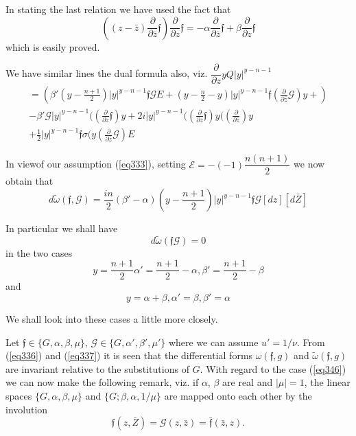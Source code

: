  In stating the last relation we have used the fact that
 $$
 ((z - \bar{z})\frac{\partial}{\partial \bar{z}}\mathfrak{f})
 \frac{\partial}{\partial z} \mathfrak{f} =- \alpha
 \frac{\partial}{\partial \bar{z}} \mathfrak{f} + \beta
 \frac{\partial}{\partial z} \mathfrak{f} 
 $$
 which is easily proved.
 
 We have similar lines the dual formula also, viz.
 $\dfrac{\partial}{\partial z} y Q |y| ^{y -n -1}$
 \begin{gather*}
= (\beta' (y - \frac{n+1}{2}) |y|^{y - n - 1} \mathfrak{f}
\mathcal{G} E + (y - \frac{n}{2} - y) |y|^{y - n - 1}
\mathfrak{f} (\frac{\partial}{\partial \bar{z}}\mathcal{G}) y +)\\ 
- \beta ' \mathcal{G} |y|^{y - n - 1} ((\frac{\partial}{\partial
  z}\mathfrak{f}) y + 2i |y|^{y - n -1}((\frac{\partial}{\partial
  z} \mathfrak{f}) y ((\frac{\partial}{\partial \bar{z}}) y\\ 
+ \frac{1}{2}|y|^{y - n -1} \mathfrak{f} \sigma (y
(\frac{\partial}{\partial \bar{z}} \mathcal{G}) E \tag{342}\label{eq342}   
 \end{gather*} 
 
 In view\pageoriginale of our assumption (\ref{eq333}), setting
 $\mathcal{E} = - (-1)  \dfrac {n (n + 1 )}{2}$ we now obtain that   
 \begin{equation*}
d \tilde{\omega} (\mathfrak{f}, \mathcal{G}) = \frac{in } {2} (\beta' -
\alpha )(y - \frac{n + 1 } {2}) |y|^{y - n - 1} \mathfrak{f}
\mathcal{G} [dz ] [ d \bar{Z}] \tag{343}\label{eq343}   
 \end{equation*} 
 
 In particular we shall have 
 \begin{equation*}
d \tilde{\omega } (\mathfrak{f} \mathscr{G}) = 0 \tag{344}\label{eq344}  
 \end{equation*} 
 in the two cases 
 \begin{equation*}
y = \frac{n + 1 } {2} \alpha' = \frac{n + 1 } {2} - \alpha,
\beta' = \frac{n + 1 } {2} - \beta \tag{345}\label{eq345}   
 \end{equation*} 
 and 
 \begin{equation*}
y = \alpha + \beta, \alpha' = \beta, \beta' = \alpha \tag{346}\label{eq346}  
 \end{equation*} 
 
 We shall look into these cases a little more closely. 
 
 Let $\mathfrak{f} \in \{ G, \alpha, \beta, \mu \}$, $\mathcal{G} \in
 \{ G, \alpha', \beta', \mu' \} $ where we can assume $u' =
 1/\nu$. From (\ref{eq336}) and (\ref{eq337}) it is seen that the differential
 forms $\omega (\mathfrak{f}, g)$ and $\tilde{\omega}
 (\mathfrak{f}, g)$ are invariant relative to
 the substitutions of $G$. With regard to the case (\ref{eq346}) we can now
 make the following remark, viz. if $\alpha$, $\beta$ are real and
 $|\mu | = 1 $, the linear spaces $\{ G, \alpha, \beta, \mu\}$ and $\{
 G; \beta, \alpha, 1/\mu \}$ are mapped onto each other by the
 involution  
 $$
 \mathfrak{f} (z, \bar{Z}) = \mathcal{G} (z, \bar{z} ) =
 \bar{\mathfrak{f}} (\bar{z}, z). 
 $$
 
